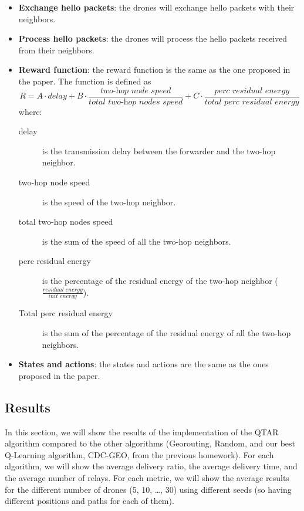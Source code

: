 \begin{itemize}
    \item \textbf{Exchange hello packets}: the drones will exchange hello packets with their neighbors.
    \item \textbf{Process hello packets}: the drones will process the hello packets received from their neighbors.
    \item \textbf{Reward function}: the reward function is the same as the one proposed in the paper. The function is defined as 
    \begin{equation}
        R = A \cdot {\textit{delay}} + B \cdot \frac{\textit{two-hop node speed}}{\textit{total two-hop nodes speed}} + C \cdot \frac{\textit{perc residual energy}}{\textit{total perc residual energy}}
    \end{equation}
    where:
    \begin{description}
        \item[delay] is the transmission delay between the forwarder and the two-hop neighbor.
        \item[two-hop node speed] is the speed of the two-hop neighbor.
        \item[total two-hop nodes speed] is the sum of the speed of all the two-hop neighbors.
        \item[perc residual energy] is the percentage of the residual energy of the two-hop neighbor ($\frac{\textit{residual energy}}{\textit{init energy}}$).
        \item[Total perc residual energy] is the sum of the percentage of the residual energy of all the two-hop neighbors.
    \end{description}

    \item \textbf{States and actions}: the states and actions are the same as the ones proposed in the paper.
\end{itemize}



\subsection{Results}
In this section, we will show the results of the implementation of the QTAR algorithm compared to the other algorithms (Georouting, Random, and our best Q-Learning algorithm, CDC-GEO, from the previous homework).
For each algorithm, we will show the average delivery ratio, the average delivery time, and the average number of relays.
For each metric, we will show the average results for the different number of drones (5, 10, \ldots, 30) using different seeds (so having different positions and paths for each of them). 

